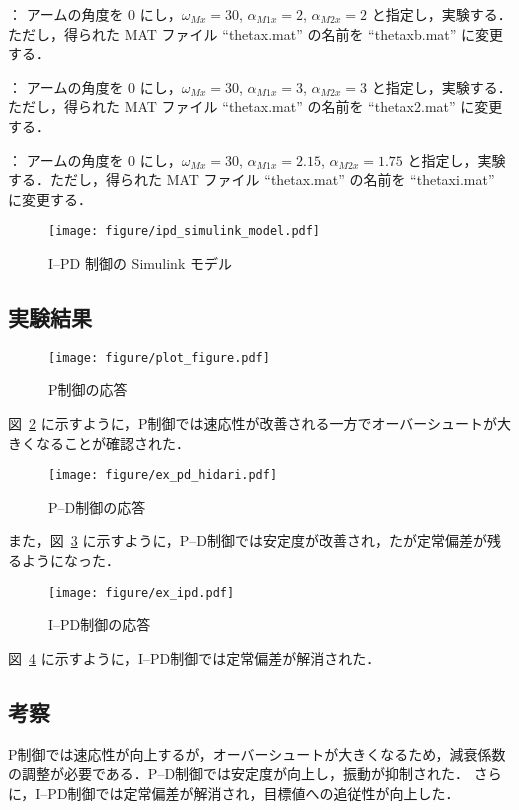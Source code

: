 ：
アームの角度を 0 にし，$\omega_{Mx} = 30$, $\alpha_{M1x} = 2$, $\alpha_{M2x} = 2$ と指定し，実験する．ただし，得られた MAT ファイル ``thetax.mat'' の名前を ``thetaxb.mat'' に変更する．

：
アームの角度を 0 にし，$\omega_{Mx} = 30$, $\alpha_{M1x} = 3$, $\alpha_{M2x} = 3$ と指定し，実験する．ただし，得られた MAT ファイル ``thetax.mat'' の名前を ``thetax2.mat'' に変更する．

：
アームの角度を 0 にし，$\omega_{Mx} = 30$, $\alpha_{M1x} = 2.15$, $\alpha_{M2x} = 1.75$ と指定し，実験する．ただし，得られた MAT ファイル ``thetax.mat'' の名前を ``thetaxi.mat'' に変更する．

\begin{figure}[H]
    \centering
    \texttt{[image: figure/ipd\_simulink\_model.pdf]}
    \caption{I--PD 制御の Simulink モデル}
    \label{fig:ipd_simulink}
\end{figure}

\subsection{実験結果}
\begin{figure}[H]
    \centering
    \texttt{[image: figure/plot\_figure.pdf]}
    \caption{P制御の応答}
    \label{fig:step_response}
\end{figure}

図~\ref{fig:step_response} に示すように，P制御では速応性が改善される一方でオーバーシュートが大きくなることが確認された．

\begin{figure}[H]
    \centering
    \texttt{[image: figure/ex\_pd\_hidari.pdf]}
    \caption{P--D制御の応答}
    \label{fig:pd_response}
\end{figure}

また，図~\ref{fig:pd_response} に示すように，P--D制御では安定度が改善され，たが定常偏差が残るようになった．

\begin{figure}[H]
    \centering
    \texttt{[image: figure/ex\_ipd.pdf]}
    \caption{I--PD制御の応答}
    \label{fig:ipd_result}
\end{figure}

図~\ref{fig:ipd_result} に示すように，I--PD制御では定常偏差が解消された．
\subsection{考察}
P制御では速応性が向上するが，オーバーシュートが大きくなるため，減衰係数の調整が必要である．P--D制御では安定度が向上し，振動が抑制された．
さらに，I--PD制御では定常偏差が解消され，目標値への追従性が向上した．

